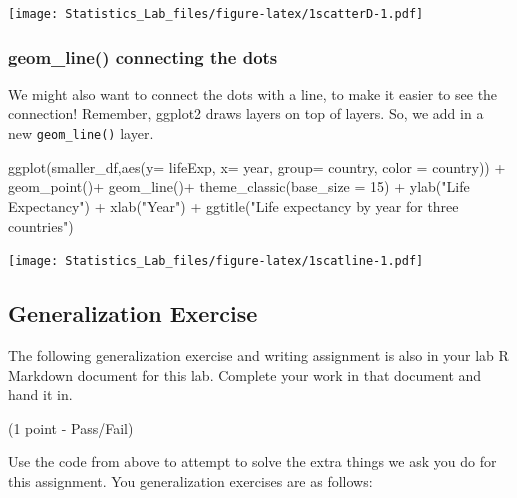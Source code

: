 \documentclass[
]{book}
\newenvironment{Shaded}{\begin{snugshade}}{\end{snugshade}}
\newcommand{\AttributeTok}[1]{\textcolor[rgb]{0.77,0.63,0.00}{#1}}
\newcommand{\DecValTok}[1]{\textcolor[rgb]{0.00,0.00,0.81}{#1}}
\newcommand{\FunctionTok}[1]{\textcolor[rgb]{0.00,0.00,0.00}{#1}}
\newcommand{\NormalTok}[1]{#1}
\newcommand{\SpecialCharTok}[1]{\textcolor[rgb]{0.00,0.00,0.00}{#1}}
\newcommand{\StringTok}[1]{\textcolor[rgb]{0.31,0.60,0.02}{#1}}
\begin{document}
\texttt{[image: Statistics\_Lab\_files/figure-latex/1scatterD-1.pdf]}

\hypertarget{geom_line-connecting-the-dots}{%
\subsubsection{geom\_line() connecting the dots}\label{geom_line-connecting-the-dots}}

We might also want to connect the dots with a line, to make it easier to see the connection! Remember, ggplot2 draws layers on top of layers. So, we add in a new \texttt{geom\_line()} layer.

\begin{Shaded}
\begin{Highlighting}[]
\FunctionTok{ggplot}\NormalTok{(smaller\_df,}\FunctionTok{aes}\NormalTok{(}\AttributeTok{y=}\NormalTok{ lifeExp, }\AttributeTok{x=}\NormalTok{ year, }
                      \AttributeTok{group=}\NormalTok{ country, }\AttributeTok{color =}\NormalTok{ country)) }\SpecialCharTok{+}
  \FunctionTok{geom\_point}\NormalTok{()}\SpecialCharTok{+} 
  \FunctionTok{geom\_line}\NormalTok{()}\SpecialCharTok{+}
  \FunctionTok{theme\_classic}\NormalTok{(}\AttributeTok{base\_size =} \DecValTok{15}\NormalTok{) }\SpecialCharTok{+}
  \FunctionTok{ylab}\NormalTok{(}\StringTok{"Life Expectancy"}\NormalTok{) }\SpecialCharTok{+} 
  \FunctionTok{xlab}\NormalTok{(}\StringTok{"Year"}\NormalTok{) }\SpecialCharTok{+}
  \FunctionTok{ggtitle}\NormalTok{(}\StringTok{"Life expectancy by year for three countries"}\NormalTok{)}
\end{Highlighting}
\end{Shaded}

\texttt{[image: Statistics\_Lab\_files/figure-latex/1scatline-1.pdf]}

\hypertarget{generalization-exercise}{%
\subsection{Generalization Exercise}\label{generalization-exercise}}

The following generalization exercise and writing assignment is also in your lab R Markdown document for this lab. Complete your work in that document and hand it in.

(1 point - Pass/Fail)

Use the code from above to attempt to solve the extra things we ask you do for this assignment. You generalization exercises are as follows:
\end{document}
